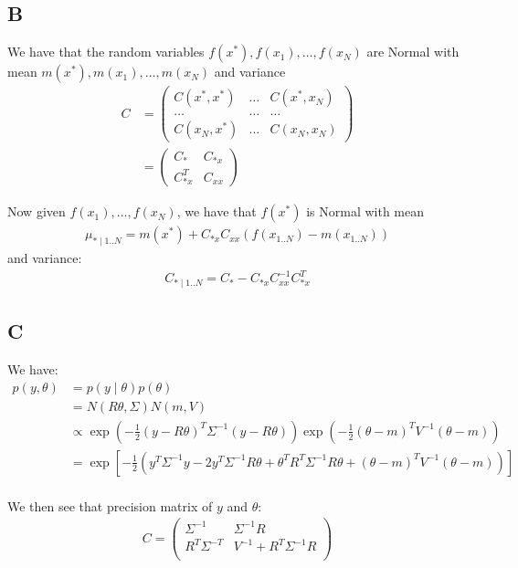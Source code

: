 \documentclass{article}
\begin{document}
\subsection*{B}
We have that the random variables \(f(x^*), f(x_1), \ldots, f(x_N)\) are Normal with mean \( m(x^*), m(x_1), \ldots, m(x_N)\) and variance
\begin{align*}
C &= \begin{pmatrix}
C(x^*, x^*) & \ldots & C(x^*, x_N)\\
\ldots      & \ldots & \ldots\\
C(x_N, x^*) & \ldots & C(x_N, x_N)
\end{pmatrix}\\
&= \begin{pmatrix}
C_* & C_{*x}\\
C_{*x}^T & C_{xx}
\end{pmatrix}
\end{align*}

Now given \( f(x_1), \ldots, f(x_N)\), we have that \(f(x^*)\) is Normal with mean \begin{align*}
\mu_{* \mid 1..N} =  m(x^*) + C_{*x} C_{xx} ( f(x_{1..N}) - m(x_{1..N}))
\end{align*}
and variance:
\begin{align*}
C_{* \mid 1..N} = C_{*} - C_{*x} C_{xx}^{-1} C_{*x}^T
\end{align*}

\subsection*{C}
We have:
\begin{align*}
p(y, \theta) &= p(y \mid \theta) p(\theta)\\
&= N(R\theta, \Sigma) N(m, V)\\
&\propto \exp\left( -\frac{1}{2} (y - R\theta)^T \Sigma^{-1} (y - R\theta) \right) \exp\left( -\frac{1}{2} (\theta - m)^T V^{-1} (\theta - m) \right)\\
& = \exp\left[ -\frac{1}{2} \left( y^T\Sigma^{-1}y - 2y^T\Sigma^{-1}R\theta + \theta^TR^T\Sigma^{-1} R\theta  + (\theta - m)^T V^{-1} (\theta - m) \right) \right]\\
\end{align*}

We then see that precision matrix of \(y\) and \(\theta\):
\begin{align*}
C = \begin{pmatrix}
\Sigma^{-1} & \Sigma^{-1}R \\
R^T \Sigma^{-T} & V^{-1} + R^T\Sigma^{-1} R\\
\end{pmatrix}
\end{align*}
\end{document}
